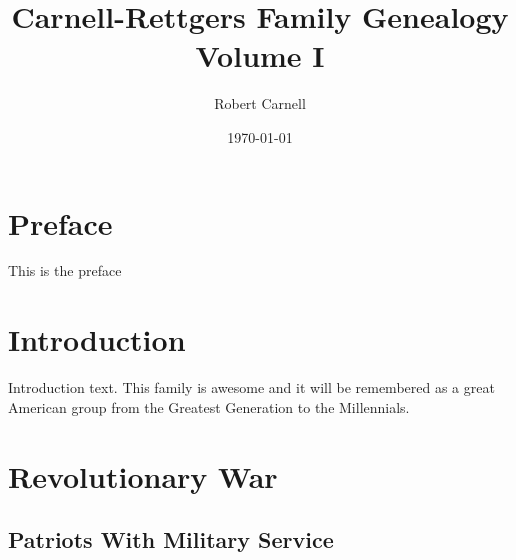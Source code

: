 \documentclass[11pt,letter]{book}
\title{\bf Carnell-Rettgers Family Genealogy \\
       \large Volume I}
\author{Robert Carnell}
\date{\today}
\begin{document}
\frontmatter
\maketitle
\chapter{Preface}

This is the preface

\tableofcontents
\mainmatter
\chapter{Introduction}

Introduction text.  This family is awesome and it will be remembered as a great American
group from the Greatest Generation to the Millennials.

\chapter{Revolutionary War}

\section{Patriots With Military Service}
\end{document}
